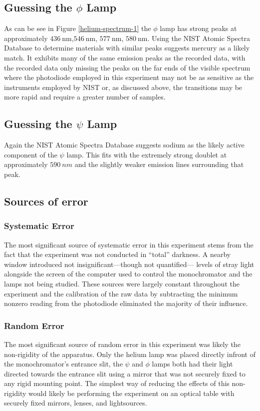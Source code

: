 \documentclass[10pt, twocolumn]{article}
\theoremstyle{definition}
\begin{document}
\subsection{Guessing the $\phi$ Lamp}
As can be see in Figure  \ref{helium-spectrum-1} the $\phi$ lamp has strong peaks at approximately
$\qty{436}{\nano\meter}$,$\qty{546}{\nano\meter}$, $\qty{577}{\nano\meter}$, $\qty{580}{\nano\meter}$. Using the
NIST Atomic Spectra Database\autocite{spectrum-db} to determine materials with similar peaks suggests mercury as a likely
match. It exhibits many of the same emission peaks as the recorded data,
with the recorded data only missing the peaks on the far ends of the visible spectrum where the photodiode employed in
this experiment may not be as sensitive as the instruments employed by NIST or, as discussed above, the transitions may be more rapid
and require a greater number of samples.
\subsection{Guessing the $\psi$ Lamp}
Again the NIST Atomic Spectra Database\autocite{spectrum-db} suggests sodium as the likely active component of the $\psi$ lamp.
This fits with the extremely strong doublet at approximately $\qty{590}{nm}$ and the slightly weaker emission lines surrounding that
peak.
\subsection{Sources of error}
\subsubsection{Systematic Error}
The most significant source of systematic error in this experiment stems from the fact that the experiment
was not conducted in ``total'' darkness. A nearby window introduced not insignificant---though not quantified---
levels of stray light alongside the screen of the computer used to control the monochromator and the lamps not
being studied. These sources were largely constant throughout the experiment and the calibration of the raw data by
subtracting the minimum nonzero reading from the photodiode eliminated the majority of their
influence.
\subsubsection{Random Error}
The most significant source of random error in this experiment was likely the non-rigidity of the apparatus. Only the helium
lamp was placed directly infront of the monochromator's entrance slit, the $\psi$ and $\phi$ lamps both had their light directed
towards the entrance slit using a mirror that was not securely fixed to any rigid mounting point. The simplest way of
reducing the effects of this non-rigidity would likely be performing the experiment on an optical table with securely fixed
mirrors, lenses, and lightsources.
\end{document}
